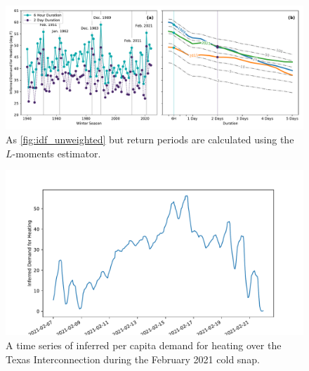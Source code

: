 \documentclass[12pt]{iopart}
\begin{document}
\begin{figure}
  \centering
  \includegraphics[width=\textwidth]{ERCOT_HDD_IDF_plotpos_unweighted.pdf}
  \caption{
    As \cref{fig:idf_unweighted} but return periods are calculated using the $L$-moments estimator.
  }\label{fig:idf_lmoments_unweighted}
\end{figure}

\begin{figure}
  \centering
  \includegraphics[width=\textwidth]{HDD_pop_weighted_ts.pdf}
  \caption{
    A time series of inferred per capita demand for heating over the Texas Interconnection during the February 2021 cold snap.
  }\label{fig:hdd_ts}
\end{figure}
\end{document}
